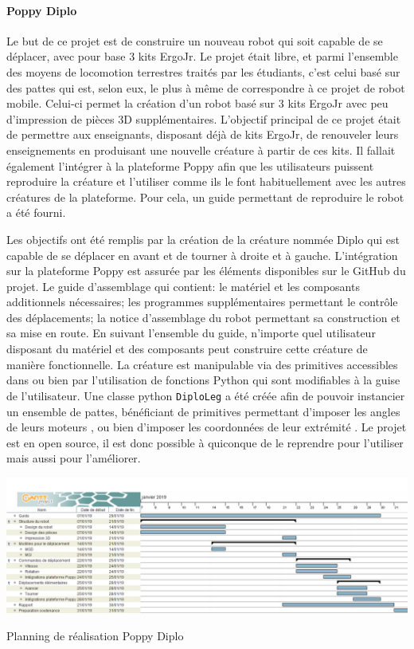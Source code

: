         \paragraph{Poppy Diplo}\label{sec:diplo}
            Le but de ce projet est de construire un nouveau robot qui soit capable de se déplacer, avec pour base 3 kits ErgoJr. Le projet était libre, et parmi l'ensemble des moyens de locomotion terrestres traités par les étudiants, c'est celui basé sur des pattes qui est, selon eux, le plus à même de correspondre à ce projet de robot mobile. Celui-ci permet la création d'un robot basé sur 3 kits ErgoJr avec peu d'impression de pièces 3D supplémentaires.
            L'objectif principal de ce projet était de permettre aux enseignants, disposant déjà de kits ErgoJr, de renouveler leurs enseignements en produisant une nouvelle créature à partir de ces kits. Il fallait également l'intégrer à la plateforme Poppy afin que les utilisateurs puissent reproduire la créature et l'utiliser comme ils le font habituellement avec les autres créatures de la plateforme. Pour cela, un guide permettant de reproduire le robot a été fourni.\par%
            Les objectifs ont été remplis par la création de la créature nommée Diplo qui est capable de se déplacer en avant et de tourner à droite et à gauche. L'intégration sur la plateforme Poppy est assurée par les éléments disponibles sur le GitHub du projet. Le guide d'assemblage qui contient: \Li le matériel et les composants additionnels nécessaires; \ii les programmes supplémentaires permettant le contrôle des déplacements; \iii la notice d'assemblage du robot permettant sa construction et sa mise en route.
            En suivant l'ensemble du guide, n'importe quel utilisateur disposant du matériel et des composants peut construire cette créature de manière fonctionnelle. La créature est manipulable via des primitives accessibles dans  ou bien par l'utilisation de fonctions Python qui sont modifiables à la guise de l'utilisateur.
            Une classe python \texttt{DiploLeg} a été créée afin de pouvoir instancier un ensemble de pattes, bénéficiant de primitives permettant d'imposer les angles de leurs moteurs , ou bien d'imposer les coordonnées de leur extrémité .
            Le projet est en open source, il est donc possible à quiconque de le reprendre pour l'utiliser mais aussi pour l'améliorer.\par%
            \begin{table}[!h]
                \centering
                \includegraphics[width=\linewidth]{Figures/Diplo-Planning}
                \caption{Planning de réalisation Poppy Diplo}\label{tab:diplo_plan}
            \end{table}\par%
